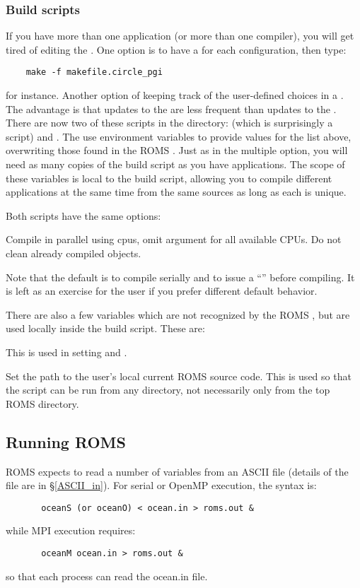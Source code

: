 \subsubsection{Build scripts}

If you have more than one application (or more than one compiler),
you will get tired of editing the .
One option is to have a  for each configuration, then
type:
\begin{verbatim}
    make -f makefile.circle_pgi
\end{verbatim}
for instance. Another option of keeping track of the user-defined
choices in a . The advantage is that updates
to the  are less frequent than updates to the
. There are now two of these scripts in the 
directory:  (which is surprisingly a  script)
and .  The  use environment variables
to provide values for the list above, overwriting those found in the ROMS
. Just as in the multiple  option, you will
need as many copies of the build script as you have applications. The
scope of these variables is local to the build script, allowing you to
compile different applications at the same time from the same sources
as long as each  is unique.

Both scripts have the same options:
\begin{klist}
   Compile in parallel using  cpus,
  omit argument for all available CPUs.
      Do not clean already compiled objects.
\end{klist}
Note that the default is to compile serially and to issue a
``'' before compiling. It is left as an exercise
for the user if you prefer different default behavior.

There are also a few variables which are not recognized by the ROMS
, but are used locally inside the build script. These
are:
\begin{klist}
 This is used in setting
 and .

 Set the path to the user's local current ROMS source
code. This is used so that the script can be run from any directory,
not necessarily only from the top ROMS directory.
\end{klist}

\subsection{Running ROMS}
\label{Running}
ROMS expects to read a number of variables from an ASCII file
(details of the file are in \S\ref{ASCII_in}).
For serial or OpenMP execution, the syntax is:
\begin{verbatim}
       oceanS (or oceanO) < ocean.in > roms.out &
\end{verbatim}
while MPI execution requires:
\begin{verbatim}
       oceanM ocean.in > roms.out &
\end{verbatim}
so that each process can read the ocean.in file.

